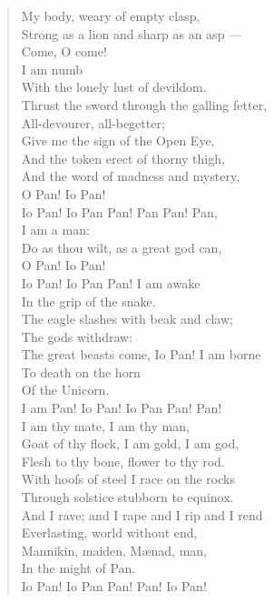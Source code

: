 \begin{verse}
My body, weary of empty clasp, \\
Strong as a lion and sharp as an asp --- \\
Come, O come! \\
I am numb \\
With the lonely lust of devildom. \\
Thrust the sword through the galling fetter, \\
All-devourer, all-begetter; \\
Give me the sign of the Open Eye, \\
And the token erect of thorny thigh, \\
And the word of madness and mystery, \\
O Pan! Io Pan! \\
Io Pan! Io Pan Pan! Pan Pan! Pan, \\
I am a man: \\
Do as thou wilt, as a great god can, \\
O Pan! Io Pan! \\
Io Pan! Io Pan Pan! I am awake \\
In the grip of the snake. \\
The eagle slashes with beak and claw; \\
The gods withdraw: \\
The great beasts come, Io Pan! I am borne \\
To death on the horn \\
Of the Unicorn. \\
I am Pan! Io Pan! Io Pan Pan! Pan! \\
I am thy mate, I am thy man, \\
Goat of thy flock, I am gold, I am god, \\
Flesh to thy bone, flower to thy rod. \\
With hoofs of steel I race on the rocks \\
Through solstice stubborn to equinox. \\
And I rave; and I rape and I rip and I rend \\
Everlasting, world without end, \\
Mannikin, maiden, M\ae{}nad, man, \\
In the might of Pan. \\
Io Pan! Io Pan Pan! Pan! Io Pan!
\end{verse}
